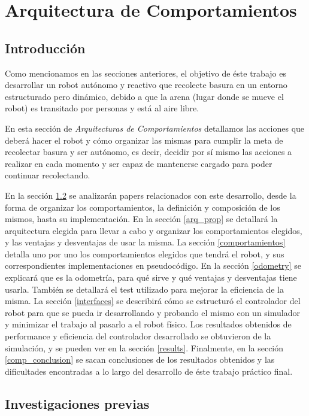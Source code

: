 \section{Arquitectura de Comportamientos}

\subsection{Introducci\'on}
Como mencionamos en las secciones anteriores, el objetivo de \'este trabajo
es desarrollar un robot aut\'onomo y reactivo que recolecte basura en un entorno
estructurado pero din\'amico, debido a que la arena (lugar donde se
mueve el robot) es transitado por personas y est\'a al aire libre.

En esta secci\'on de \emph{Arquitecturas de Comportamientos} detallamos
las acciones que deber\'a hacer el robot y c\'omo organizar las mismas
para cumplir la meta de recolectar basura y ser aut\'onomo, es decir, decidir
por s\'i mismo las acciones a realizar en cada momento y ser capaz de mantenerse
cargado para poder continuar recolectando.

En la secci\'on \ref{inv_prev} se analizar\'an
papers relacionados con este desarrollo, desde la forma de organizar los
comportamientos, la definici\'on y composici\'on de los mismos, hasta su
implementaci\'on. En la secci\'on \ref{arq_prop} se detallar\'a la arquitectura
elegida para llevar a cabo y organizar los comportamientos elegidos, y las
ventajas y desventajas de usar la misma. La secci\'on \ref{comportamientos}
detalla uno por uno los comportamientos elegidos que tendr\'a el robot, y sus
correspondientes implementaciones en pseudoc\'odigo. En la secci\'on
\ref{odometry} se explicar\'a que es la odometr\'ia, para qu\'e sirve y qu\'e
ventajas y desventajas tiene usarla. Tambi\'en se detallar\'a el test utilizado
para mejorar la eficiencia de la misma. La secci\'on \ref{interfaces} se
describir\'a c\'omo se estructur\'o el controlador del robot para que se pueda
ir desarrollando y probando el mismo con un simulador y minimizar el trabajo
al pasarlo a el robot f\'isico. Los resultados obtenidos de performance y
eficiencia del controlador desarrollado se obtuvieron de la simulaci\'on, y se
pueden ver en la secci\'on \ref{results}. Finalmente, en la secci\'on
\ref{comp_conclusion} se sacan conclusiones de los resultados obtenidos y las
dificultades encontradas a lo largo del desarrollo de \'este trabajo pr\'actico
final.

\newpage

\subsection{Investigaciones previas}
\label{inv_prev}

